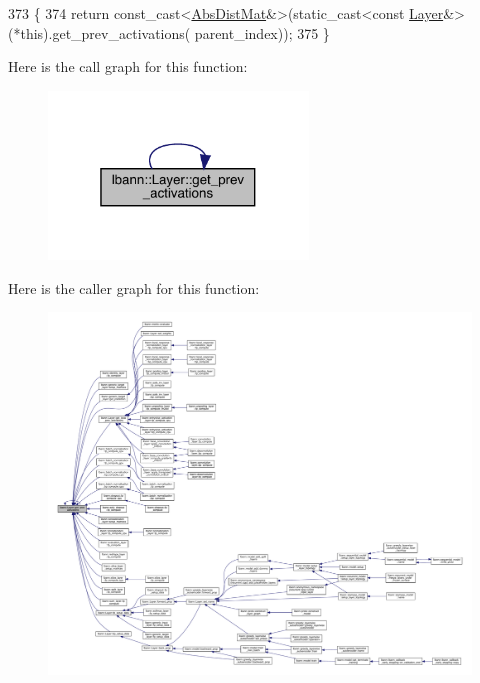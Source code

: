 \begin{DoxyCode}
373                                                         \{
374   \textcolor{keywordflow}{return} \textcolor{keyword}{const\_cast<}\hyperlink{base_8hpp_a9a697a504ae84010e7439ffec862b470}{AbsDistMat}&\textcolor{keyword}{>}(\textcolor{keyword}{static\_cast<}\textcolor{keyword}{const }\hyperlink{classlbann_1_1Layer_a24e9c82354a0a2af1b70cbca2211e7d4}{Layer}&\textcolor{keyword}{>}(*this).get\_prev\_activations(
      parent\_index));
375 \}
\end{DoxyCode}
Here is the call graph for this function\+:\nopagebreak
\begin{figure}[H]
\begin{center}
\leavevmode
\includegraphics[width=196pt]{classlbann_1_1Layer_a45853df73a2e72bfaa774665a0f37ed7_cgraph}
\end{center}
\end{figure}
Here is the caller graph for this function\+:\nopagebreak
\begin{figure}[H]
\begin{center}
\leavevmode
\includegraphics[width=350pt]{classlbann_1_1Layer_a45853df73a2e72bfaa774665a0f37ed7_icgraph}
\end{center}
\end{figure}
\mbox{\label{classlbann_1_1Layer_afc0611b7c3b1537914f25a538486a8cd}} 
